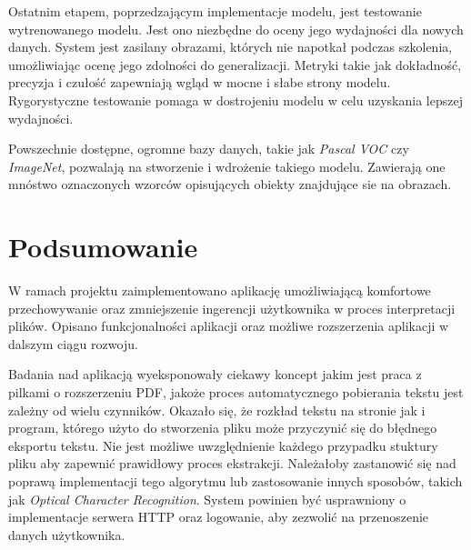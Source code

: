 \documentclass[12pt,a4paper,twoside]{article}
\begin{document}
Ostatnim etapem, poprzedzającym implementacje modelu, jest testowanie wytrenowanego modelu. Jest ono niezbędne do oceny jego wydajności dla nowych danych. System jest zasilany obrazami, których nie napotkał podczas szkolenia, umożliwiając ocenę jego zdolności do generalizacji. Metryki takie jak dokładność, precyzja i czułość zapewniają wgląd w mocne i słabe strony modelu. Rygorystyczne testowanie pomaga w dostrojeniu modelu w celu uzyskania lepszej wydajności.\par
Powszechnie dostępne, ogromne bazy danych, takie jak \textit{Pascal VOC} czy \textit{ImageNet}, pozwalają na stworzenie i wdrożenie takiego modelu. Zawierają one mnóstwo oznaczonych wzorców opisujących obiekty znajdujące sie na obrazach. 
\section*{Podsumowanie}
W ramach projektu zaimplementowano aplikację umożliwiającą komfortowe przechowywanie oraz zmniejszenie ingerencji użytkownika w proces interpretacji plików. Opisano funkcjonalności aplikacji oraz możliwe rozszerzenia  aplikacji w dalszym ciągu rozwoju. \par
Badania nad aplikacją wyeksponowały ciekawy koncept jakim jest praca z pilkami o rozszerzeniu PDF, jakoże proces automatycznego pobierania tekstu jest zależny od wielu czynników. Okazało się, że rozkład tekstu na stronie jak i program, którego użyto do stworzenia pliku może przyczynić się do błędnego eksportu tekstu. Nie jest możliwe uwzględnienie każdego przypadku stuktury pliku aby zapewnić prawidłowy proces ekstrakcji. Należałoby zastanowić się nad poprawą implementacji tego algorytmu lub zastosowanie innych sposobów, takich jak \textit{Optical Character Recognition}. System powinien być usprawniony o implementacje serwera HTTP oraz logowanie, aby zezwolić na przenoszenie danych użytkownika.
\newpage
\listoffigures
{}


\end{document}
